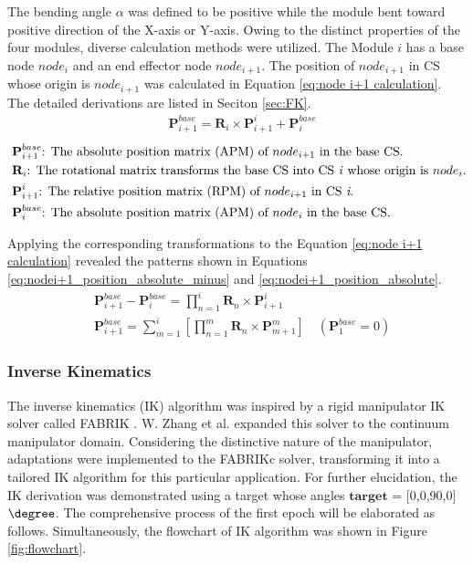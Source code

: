 The bending angle $\alpha$ was defined to be positive while the module bent toward positive 
direction of the X-axis or Y-axis. Owing to the distinct properties of the four modules, diverse calculation 
methods were utilized. The Module $i$ has a base node $node_i$ and an end effector node $node_{i+1}$. 
The position of $node_{i+1}$ in CS whose origin is $node_{i+1}$ was calculated in Equation 
\ref{eq:node i+1 calculation}. The detailed derivations are listed in Seciton \ref{sec:FK}.
\begin{align}
    &\textbf{P}_{i+1}^{base} = \textbf{R}_{i} \times \textbf{P}_{i+1}^{i} + \textbf{P}_{i}^{base}
    \label{eq:node i+1 calculation}
\end{align}
\vspace{-18mm}
\begin{align*}
    &\ \textbf{P}_{i+1}^{base}\text{: The absolute position matrix (APM) of $node_{i+1}$ in the base CS.}\\
    &\ \textbf{R}_{i}\text{: The rotational matrix transforms the base CS into CS \textit{i} whose origin is $node_i$.}\\
    &\ \textbf{P}_{i+1}^{i}\text{: The relative position matrix (RPM) of $node_{i+1}$ in CS \textit{i}.}\\
    &\ \textbf{P}_{i}^{base}\text{: The absolute position matrix (APM) of $node_{i}$ in the base CS.}
\end{align*}

Applying the corresponding transformations to the Equation \ref{eq:node i+1 calculation} revealed the patterns shown 
in Equations \ref{eq:nodei+1_position_absolute_minus} and \ref{eq:nodei+1_position_absolute}.
\vspace{-5mm}
\begin{align}
    &\textbf{P}_{i+1}^{base} - \textbf{P}_{i}^{base} = \prod_{n=1}^{i}\textbf{R}_{n}\times \textbf{P}_{i+1}^{i} 
    \label{eq:nodei+1_position_absolute_minus} \\
    &\textbf{P}_{i+1}^{base} = \sum_{m=1}^{i}\left[\prod_{n=1}^{m}\textbf{R}_{n}\times \textbf{P}_{m+1}^{m}\right] \quad(\textbf{P}_{1}^{base} = 0)
    \label{eq:nodei+1_position_absolute}
\end{align}
\vspace{-5mm}
\subsubsection{Inverse Kinematics}
The inverse kinematics (IK) algorithm was inspired by a rigid manipulator IK solver called FABRIK 
\cite{fabrik}. W. Zhang et al.\cite{fabrikc} expanded this solver to the continuum manipulator domain. Considering 
the distinctive nature of the manipulator, adaptations were implemented to the FABRIKc solver, transforming it 
into a tailored IK algorithm for this particular application. For further elucidation, the IK derivation was 
demonstrated using a target whose angles $\boldsymbol{target}$ = [0,0,90,0] $\degree$. The comprehensive process 
of the first epoch will be elaborated as follows. Simultaneously, the flowchart of IK algorithm was shown in 
Figure \ref{fig:flowchart}. 

